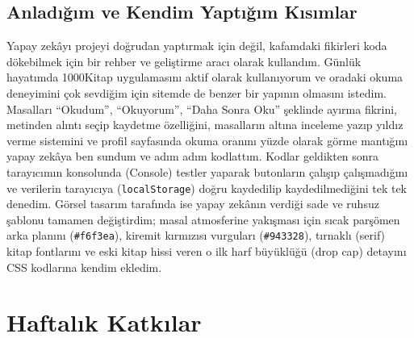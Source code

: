 \documentclass[12pt,a4paper]{article}
\begin{document}
\subsection{Anladığım ve Kendim Yaptığım Kısımlar}
Yapay zekâyı projeyi doğrudan yaptırmak için değil, kafamdaki fikirleri koda dökebilmek için bir rehber ve geliştirme aracı olarak kullandım. Günlük hayatımda 1000Kitap uygulamasını aktif olarak kullanıyorum ve oradaki okuma deneyimini çok sevdiğim için sitemde de benzer bir yapının olmasını istedim. Masalları ``Okudum'', ``Okuyorum'', ``Daha Sonra Oku'' şeklinde ayırma fikrini, metinden alıntı seçip kaydetme özelliğini, masalların altına inceleme yazıp yıldız verme sistemini ve profil sayfasında okuma oranını yüzde olarak görme mantığını yapay zekâya ben sundum ve adım adım kodlattım. Kodlar geldikten sonra tarayıcımın konsolunda (Console) testler yaparak butonların çalışıp çalışmadığını ve verilerin tarayıcıya (\texttt{localStorage}) doğru kaydedilip kaydedilmediğini tek tek denedim. Görsel tasarım tarafında ise yapay zekânın verdiği sade ve ruhsuz şablonu tamamen değiştirdim; masal atmosferine yakışması için sıcak parşömen arka planını (\texttt{\#f6f3ea}), kiremit kırmızısı vurguları (\texttt{\#943328}), tırnaklı (serif) kitap fontlarını ve eski kitap hissi veren o ilk harf büyüklüğü (drop cap) detayını CSS kodlarına kendim ekledim.
\section{Haftalık Katkılar}
\end{document}
